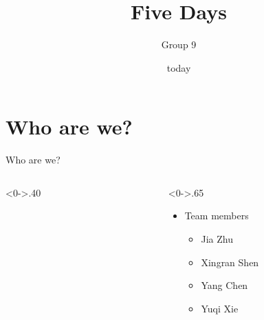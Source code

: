 \documentclass[notheorems]{beamer}
\title{Five Days}
\author{Group 9}
\date{today}
\begin{document}
\maketitle

\mindtoc

\section{Who are we?}


\begin{framenl}{Who are we?}
\begin{columns}[T]
	\begin{column}<0->{.40\textwidth}
		\begin{figure}[thpb]
			\centering
		\end{figure}
	\end{column}
	\hfill
	\begin{column}<0->{.65\textwidth}
		\begin{itemize}
			\item<1-> Team members
			\begin{itemize}
		    \item Jia Zhu
            \item Xingran Shen
            \item Yang Chen
            \item Yuqi Xie
			\end{itemize}
		\end{itemize}
	\end{column}%
\end{columns}
\end{framenl}
\end{document}
